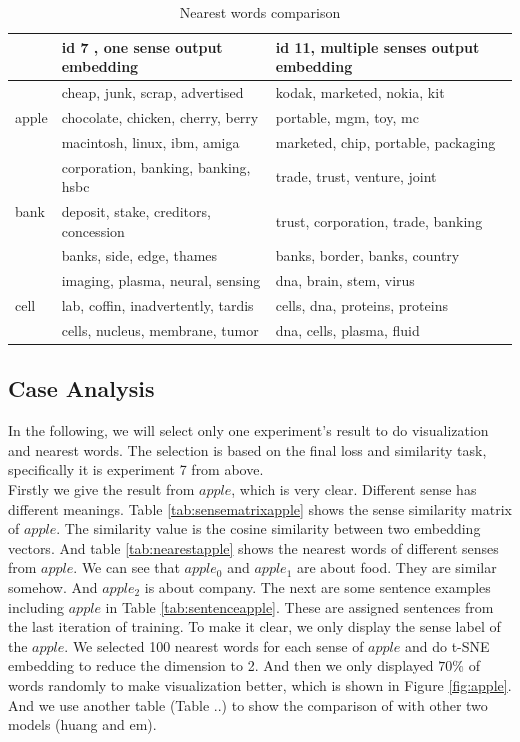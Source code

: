 \begin{table}[H]

\begin{center}
\begin{tabular}{ |l|l|l| }
\hline
 & id 7 , one sense output embedding& id 11, multiple senses output embedding \\
\hline
\hline
\multirow{3}{*}{apple} 
 & cheap, junk, scrap, advertised 				& kodak, marketed, nokia, kit \\
 & chocolate, chicken, cherry, berry 		& portable, mgm, toy, mc \\
 & macintosh, linux, ibm, amiga			& marketed, chip, portable, packaging \\ 
 \hline
\multirow{3}{*}{bank} 
 & corporation, banking, banking, hsbc & trade, trust, venture, joint \\
 & deposit, stake, creditors, concession & trust, corporation, trade, banking \\ 
 & banks, side, edge, thames &  banks, border, banks, country \\ 
 \hline
\multirow{3}{*}{cell} 
 & imaging, plasma, neural, sensing & dna, brain, stem, virus \\
 & lab, coffin, inadvertently, tardis & cells, dna, proteins, proteins \\
 & cells, nucleus, membrane, tumor & dna, cells, plasma, fluid \\
\hline
\end{tabular}
\caption{Nearest words comparison} \label{tab:nearestcompare} 
\end{center}
\end{table}

 
\subsection{Case Analysis}

In the following, we will select only one experiment's result to do visualization and nearest words. The selection is based on the final loss and similarity task, specifically it is experiment 7 from above.  \\

Firstly we give the result from $apple$,  which is very clear. Different sense has different meanings. Table \ref{tab:sensematrixapple} shows the sense similarity matrix of $apple$. The similarity value is the cosine similarity between two embedding vectors. And table \ref{tab:nearestapple} shows the nearest words of different senses from $apple$. We can see that $apple_0$ and $apple_1$ are about food. They are similar somehow. And $apple_2$ is about company. The next are some sentence examples including $apple$ in Table \ref{tab:sentenceapple}. These are assigned sentences from the last iteration of training. To make it clear, we only display the sense label of the $apple$. We selected 100 nearest words for each sense of $apple$ and do t-SNE embedding to reduce the dimension to 2. And then we only displayed $70\%$ of words randomly to make visualization better, which is shown in Figure \ref{fig:apple}. And we use another table (Table ..) to show the comparison of with other two models (huang and em).
 
